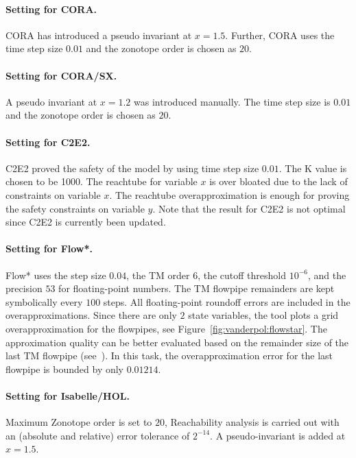 \documentclass[EPiC]{easychair}
\begin{document}
\paragraph{Setting for CORA.}
CORA has introduced a pseudo invariant at $x=1.5$. Further, CORA uses the time step size $0.01$ and the zonotope order is chosen as $20$. 

\paragraph{Setting for CORA/SX.}
A pseudo invariant at $x=1.2$ was introduced manually. The time step size is $0.01$ and the zonotope order is chosen as $20$. 

\paragraph{Setting for C2E2.} C2E2 proved the safety of the model by using time step size $0.01$. The K value is chosen to be 1000. The reachtube for variable $x$ is over bloated due to the lack of constraints on variable $x$. The reachtube overapproximation is enough for proving the safety constraints on variable $y$. Note that the result for C2E2 is not optimal since C2E2 is currently been updated.

\paragraph{Setting for Flow*.}
Flow* uses the step size $0.04$, the TM order $6$, the cutoff threshold $10^{-6}$, and the precision $53$ for floating-point numbers. The TM flowpipe remainders are kept symbolically every $100$ steps. All floating-point roundoff errors are included in the overapproximations. Since there are only $2$ state variables, the tool plots a grid overapproximation for the flowpipes, see Figure~\ref{fig:vanderpol:flowstar}. The approximation quality can be better evaluated based on the remainder size of the last TM flowpipe (see~\cite{Chen/2015/phd}). In this task, the overapproximation error for the last flowpipe is bounded by only $0.01214$.


\paragraph{Setting for Isabelle/HOL.}
Maximum Zonotope order is set to $20$, Reachability analysis is carried out with an (absolute and relative) error tolerance of $2^{-14}$. A pseudo-invariant is added at $x=1.5$. 
\end{document}
